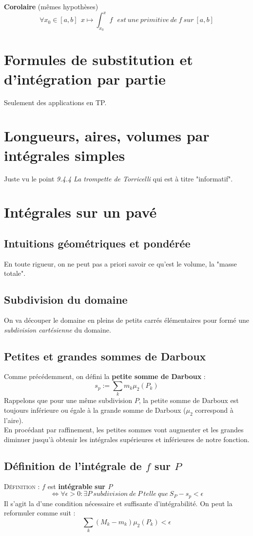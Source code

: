 \documentclass	[11pt, a4paper, openany]{book}
\begin{document}
\textbf{Corolaire} (mêmes hypothèses)
$$\forall x_0 \in [a,b]\ \ x \mapsto \int^x_{x_0} f\ \ \ est\ une\ primitive\ de\ f\ sur\ [a,b]$$

\section{Formules de substitution et d'intégration par partie}
Seulement des applications en TP.

\section{Longueurs, aires, volumes par intégrales simples}
Juste vu le point \textit{9.4.4 La trompette de Torricelli} qui est à titre "informatif".

\section{Intégrales sur un pavé}
\subsection{Intuitions géométriques et pondérée}
En toute rigueur, on ne peut pas a priori savoir ce qu'est le volume, la "masse totale".

\subsection{Subdivision du domaine}
On va découper le domaine en pleins de petits carrés élémentaires pour formé une \textit{subdivision cartésienne} du domaine.

\subsection{Petites et grandes sommes de Darboux}
Comme précédemment, on défini la \textbf{petite somme de Darboux} :
$$s_p := \sum_k m_k\mu_2(P_k)$$
Rappelons que pour une même subdivision $P$, la petite somme de Darboux est toujours inférieure ou égale à la grande somme de Darboux ($\mu_2$ correspond à l'aire). \\

En procédant par raffinement, les petites sommes vont augmenter et les grandes diminuer jusqu'à obtenir les intégrales supérieures et inférieures de notre fonction.

\subsection{Définition de l'intégrale de $f$ sur $P$}
\textsc{Définition :} $f$ est \textbf{intégrable} \textbf{sur $P$} 
$$\Leftrightarrow \forall \epsilon > 0: \exists P\ subdivision\ de\ P\ telle\ que\ S_P - s_p < \epsilon$$
Il s'agit la d'une condition nécessaire et suffisante d'intégrabilité. On peut la reformuler comme suit : 
$$\sum_k(M_k - m_k)\mu_2(P_k) < \epsilon$$
\end{document}
